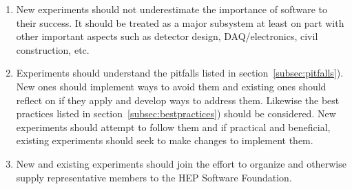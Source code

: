 \begin{enumerate}

\item New experiments should not underestimate the importance of
  software to their success.  It should be treated as a major
  subsystem at least on part with other important aspects such as
  detector design, DAQ/electronics, civil construction, etc.

\item Experiments should understand the pitfalls listed in
  section~\ref{subsec:pitfalls}).  New ones should implement ways to
  avoid them and existing ones should reflect on if they apply and
  develop ways to address them.  Likewise the best practices listed in
  section~\ref{subsec:bestpractices}) should be considered.  New
  experiments should attempt to follow them and if practical and
  beneficial, existing experiments should seek to make changes to
  implement them.

\item New and existing experiments should join the effort to organize
  and otherwise supply representative members to the HEP Software
  Foundation.

\end{enumerate}

